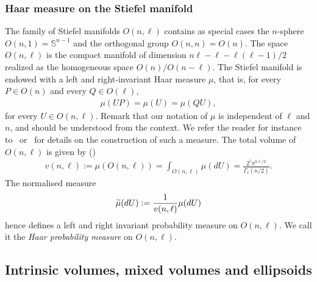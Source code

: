 \documentclass[AHL,Unicode,longabstracts,published]{cedram}
\newcommand{\bbS}{\mathbb{S}}
\let\oldtilde\tilde
\renewcommand*{\tilde}[1]{\mathchoice{\widetilde{#1}}{\widetilde{#1}}{\oldtilde{#1}}{\oldtilde{#1}}}
\begin{document}
\subsubsection*{Haar measure on the Stiefel manifold}
The family of Stiefel manifolds $O(n,\ell)$ contains as special cases the $n$-sphere $O(n,1) = \bbS^{n-1}$ and the orthogonal group $O(n,n) = O(n)$. The space $O(n,\ell)$ is the compact manifold of dimension $n\ell -
\ell - \ell(\ell-1)/2$ realized as the homogeneous space $O(n)/O(n-\ell)$. The Stiefel manifold is endowed with a left and right-invariant Haar measure $\mu$, that is, for every $P \in O(n)$ and every $Q \in O(\ell)$,
\begin{gather*}
\mu(UP) = \mu(U) = \mu(QU),
\end{gather*}
for every $U \in O(n,\ell)$. Remark that our notation of $\mu$ is independent of $\ell$ and $n$, and should be understood from the context. We refer the reader for instance to~\cite{Ch2012} or~\cite{Muir} for details on the construction of such a measure. The total volume of $O(n,\ell)$ is given by (\cite[Eq.~(1.4.8)]{Ch2012})
\begin{gather*}
v(n,\ell) := \mu(O(n,\ell)) = \int_{O(n,\ell)} \mu(dU) = \frac{2^{\ell}\pi^{n\ell/2}}{\Gamma_{\ell}(n/2)}.
\end{gather*}
The normalised measure
\begin{equation}
\tilde{\mu}(dU) := \frac{1}{v(n,\ell)} \mu(dU)
\end{equation}
hence defines a left and right invariant probability measure on $O(n,\ell)$. We call it the \emph{Haar probability measure} on $O(n,\ell)$.



\subsection{Intrinsic volumes, mixed volumes and ellipsoids}\label{SecGeom}
\end{document}
